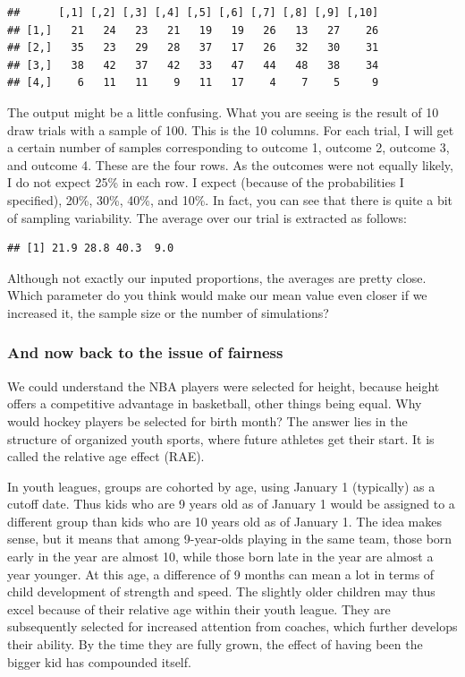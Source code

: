 \documentclass[openany]{book}
\begin{document}
\begin{verbatim}
##      [,1] [,2] [,3] [,4] [,5] [,6] [,7] [,8] [,9] [,10]
## [1,]   21   24   23   21   19   19   26   13   27    26
## [2,]   35   23   29   28   37   17   26   32   30    31
## [3,]   38   42   37   42   33   47   44   48   38    34
## [4,]    6   11   11    9   11   17    4    7    5     9
\end{verbatim}

The output might be a little confusing. What you are seeing is the result of 10 draw trials with a sample of 100. This is the 10 columns. For each trial, I will get a certain number of samples corresponding to outcome 1, outcome 2, outcome 3, and outcome 4. These are the four rows. As the outcomes were not equally likely, I do not expect 25\% in each row. I expect (because of the probabilities I specified), 20\%, 30\%, 40\%, and 10\%. In fact, you can see that there is quite a bit of sampling variability. The average over our trial is extracted as follows:

\begin{verbatim}
## [1] 21.9 28.8 40.3  9.0
\end{verbatim}

Although not exactly our inputed proportions, the averages are pretty close. Which parameter do you think would make our mean value even closer if we increased it, the sample size or the number of simulations?

\hypertarget{and-now-back-to-the-issue-of-fairness}{%
\subsubsection*{And now back to the issue of fairness}\label{and-now-back-to-the-issue-of-fairness}}

We could understand the NBA players were selected for height, because height offers a competitive advantage in basketball, other things being equal. Why would hockey players be selected for birth month? The answer lies in the structure of organized youth sports, where future athletes get their start. It is called the relative age effect (RAE).

In youth leagues, groups are cohorted by age, using January 1 (typically) as a cutoff date. Thus kids who are 9 years old as of January 1 would be assigned to a different group than kids who are 10 years old as of January 1. The idea makes sense, but it means that among 9-year-olds playing in the same team, those born early in the year are almost 10, while those born late in the year are almost a year younger. At this age, a difference of 9 months can mean a lot in terms of child development of strength and speed. The slightly older children may thus excel because of their relative age within their youth league. They are subsequently selected for increased attention from coaches, which further develops their ability. By the time they are fully grown, the effect of having been the bigger kid has compounded itself.
\end{document}
